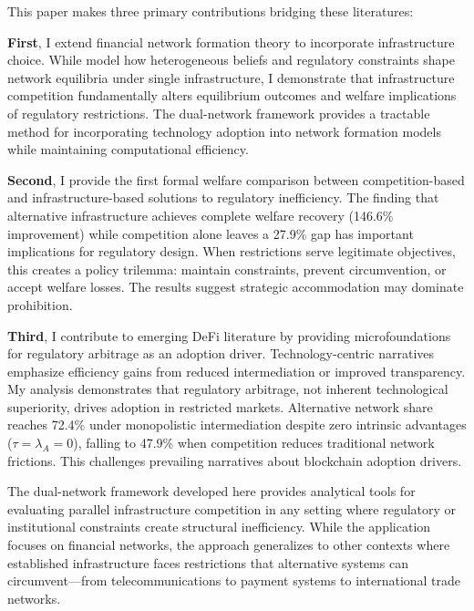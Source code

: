 \documentclass[12pt]{article}
\begin{document}
This paper makes three primary contributions bridging these literatures:

\textbf{First}, I extend financial network formation theory to incorporate infrastructure choice. While \citet{jalan_incentive-aware_2024} model how heterogeneous beliefs and regulatory constraints shape network equilibria under single infrastructure, I demonstrate that infrastructure competition fundamentally alters equilibrium outcomes and welfare implications of regulatory restrictions. The dual-network framework provides a tractable method for incorporating technology adoption into network formation models while maintaining computational efficiency.

\textbf{Second}, I provide the first formal welfare comparison between competition-based and infrastructure-based solutions to regulatory inefficiency. The finding that alternative infrastructure achieves complete welfare recovery (146.6\% improvement) while competition alone leaves a 27.9\% gap has important implications for regulatory design. When restrictions serve legitimate objectives, this creates a policy trilemma: maintain constraints, prevent circumvention, or accept welfare losses. The results suggest strategic accommodation may dominate prohibition.

\textbf{Third}, I contribute to emerging DeFi literature by providing microfoundations for regulatory arbitrage as an adoption driver. Technology-centric narratives emphasize efficiency gains from reduced intermediation or improved transparency. My analysis demonstrates that regulatory arbitrage, not inherent technological superiority, drives adoption in restricted markets. Alternative network share reaches 72.4\% under monopolistic intermediation despite zero intrinsic advantages ($\tau = \lambda_A = 0$), falling to 47.9\% when competition reduces traditional network frictions. This challenges prevailing narratives about blockchain adoption drivers.

The dual-network framework developed here provides analytical tools for evaluating parallel infrastructure competition in any setting where regulatory or institutional constraints create structural inefficiency. While the application focuses on financial networks, the approach generalizes to other contexts where established infrastructure faces restrictions that alternative systems can circumvent—from telecommunications to payment systems to international trade networks.
\end{document}
